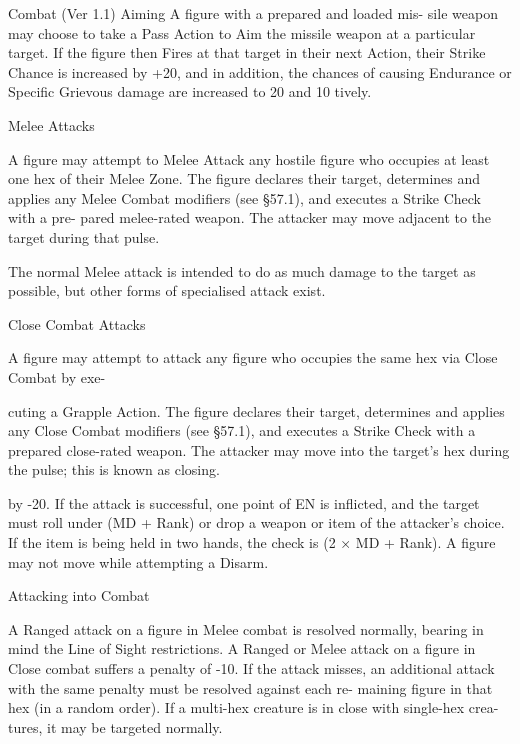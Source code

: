 \begin{Chapter}{Combat (Ver 1.1)}
Aiming  A  figure  with  a  prepared  and  loaded  mis-
sile  weapon  may  choose  to  take  a  Pass  Action  to 
Aim the missile weapon at a particular target. If the 
figure then Fires at that target in their next Action, 
their  Strike  Chance  is  increased  by  +20,  and  in 
addition,  the  chances  of  causing  Endurance  or 
Specific  Grievous  damage  are  increased  to  20%
and  10%
tively. 

Melee Attacks 

A  figure  may  attempt to  Melee  Attack  any  hostile 
figure who occupies at least one hex of their Melee 
Zone.  The  figure  declares  their  target,  determines 
and  applies  any  Melee  Combat  modifiers  (see 
§57.1),  and  executes  a  Strike  Check  with  a  pre-
pared melee-rated weapon. The attacker may move 
adjacent to the target during that pulse. 

The normal Melee attack is intended to do as much 
damage to the target as possible, but other forms of 
specialised attack exist. 

Close Combat Attacks 

A  figure  may  attempt  to  attack  any  figure  who 
occupies  the  same  hex  via  Close  Combat  by  exe-

cuting  a  Grapple  Action.  The  figure  declares  their 
target,  determines  and  applies  any  Close  Combat 
modifiers (see §57.1), and executes a Strike Check 
with  a  prepared  close-rated  weapon.  The  attacker 
may  move  into  the  target’s  hex  during  the  pulse; 
this is known as closing. 

by -20. If the attack is successful, one point of EN 
is  inflicted,  and  the  target  must  roll  under  (MD  + 
Rank)  or  drop  a  weapon  or  item  of  the  attacker’s 
choice.  If  the  item is  being  held  in  two  hands, the 
check is (2 × MD + Rank). A figure may not move 
while attempting a Disarm. 

Attacking into Combat 

A  Ranged  attack  on  a  figure  in  Melee  combat  is 
resolved  normally,  bearing  in  mind  the  Line  of 
Sight  restrictions.  A  Ranged  or  Melee  attack  on  a 
figure  in Close  combat  suffers  a  penalty  of  -10.  If 
the  attack  misses,  an  additional  attack  with  the 
same  penalty  must  be  resolved  against  each  re-
maining figure in that hex (in a random order). If a 
multi-hex creature is in close with single-hex crea-
tures, it may be targeted normally. 


\end{Chapter}
